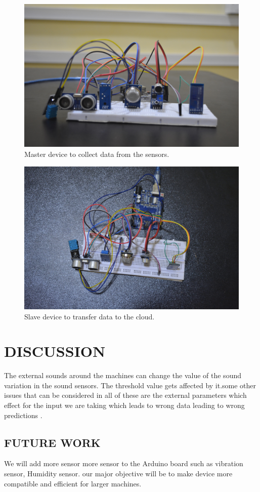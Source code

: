 \begin{figure}[h]
\centerline{\includegraphics[width=4.7in]{master2}}
\caption{Master device to collect data from the sensors.}
\end{figure}
\vspace{0.3in}
\begin{figure}[h]
\centerline{\includegraphics[width=4.7in]{slave1}}
\caption{Slave device to transfer data to the cloud.}
\end{figure}
\newpage



\newpage
\section{DISCUSSION}
The external sounds around the machines can change the value of the sound variation in the sound sensors. The threshold value gets affected by it.some other issues that can be considered in all of these are the external parameters which effect for the input we are taking which leads to wrong data leading to wrong predictions .\\
\subsection{FUTURE WORK}
We will add more sensor more sensor to the Arduino board such as vibration sensor, Humidity sensor. our major objective will be to make device more compatible and efficient for larger machines. 
